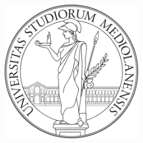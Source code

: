 
\begin{titlepage}

\begin{center}

\begin{LARGE}
\textbf{\myUni}\\
\end{LARGE}

\vspace{10pt}

\begin{Large}
\textsc{\myDepartment}\\
\end{Large}

\vspace{10pt}

\begin{Large}
\textsc{\myFaculty}\\
\end{Large}

\vspace{30pt}
\begin{figure}[htbp]
\begin{center}
\includegraphics[height=6cm]{images/unimilogo.png}
\end{center}
\end{figure}
\vspace{10pt} 

\begin{LARGE}
\begin{center}
\textbf{\myTitle}\\
\end{center}
\end{LARGE}


\end{center}
\end{titlepage}

